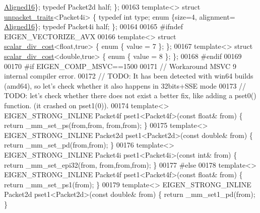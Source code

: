 \begin{DoxyCode}
      \hyperlink{group__enums_gga45fe06e29902b7a2773de05ba27b47a1af8e2bf74b04c02199f62c5e3c06dbfcc}{Aligned16}\}; \textcolor{keyword}{typedef} Packet2d half; \};
00163 \textcolor{keyword}{template}<> \textcolor{keyword}{struct }\hyperlink{struct_eigen_1_1internal_1_1unpacket__traits}{unpacket\_traits}<Packet4i> \{ \textcolor{keyword}{typedef} \textcolor{keywordtype}{int}    type; \textcolor{keyword}{enum} \{size=4, alignment=
      \hyperlink{group__enums_gga45fe06e29902b7a2773de05ba27b47a1af8e2bf74b04c02199f62c5e3c06dbfcc}{Aligned16}\}; \textcolor{keyword}{typedef} Packet4i half; \};
00164 
00165 \textcolor{preprocessor}{#ifndef EIGEN\_VECTORIZE\_AVX}
00166 \textcolor{keyword}{template}<> \textcolor{keyword}{struct }\hyperlink{struct_eigen_1_1internal_1_1scalar__div__cost}{scalar\_div\_cost}<float,true> \{ \textcolor{keyword}{enum} \{ value = 7 \}; \};
00167 \textcolor{keyword}{template}<> \textcolor{keyword}{struct }\hyperlink{struct_eigen_1_1internal_1_1scalar__div__cost}{scalar\_div\_cost}<double,true> \{ \textcolor{keyword}{enum} \{ value = 8 \}; \};
00168 \textcolor{preprocessor}{#endif}
00169 
00170 \textcolor{preprocessor}{#if EIGEN\_COMP\_MSVC==1500}
00171 \textcolor{comment}{// Workaround MSVC 9 internal compiler error.}
00172 \textcolor{comment}{// TODO: It has been detected with win64 builds (amd64), so let's check whether it also happens in
       32bits+SSE mode}
00173 \textcolor{comment}{// TODO: let's check whether there does not exist a better fix, like adding a pset0() function. (it crashed
       on pset1(0)).}
00174 \textcolor{keyword}{template}<> EIGEN\_STRONG\_INLINE Packet4f pset1<Packet4f>(\textcolor{keyword}{const} \textcolor{keywordtype}{float}&  from) \{ \textcolor{keywordflow}{return} \_mm\_set\_ps(from,from,
      from,from); \}
00175 \textcolor{keyword}{template}<> EIGEN\_STRONG\_INLINE Packet2d pset1<Packet2d>(\textcolor{keyword}{const} \textcolor{keywordtype}{double}& from) \{ \textcolor{keywordflow}{return} \_mm\_set\_pd(from,from);
       \}
00176 \textcolor{keyword}{template}<> EIGEN\_STRONG\_INLINE Packet4i pset1<Packet4i>(\textcolor{keyword}{const} \textcolor{keywordtype}{int}&    from) \{ \textcolor{keywordflow}{return} \_mm\_set\_epi32(from,
      from,from,from); \}
00177 \textcolor{preprocessor}{#else}
00178 \textcolor{keyword}{template}<> EIGEN\_STRONG\_INLINE Packet4f pset1<Packet4f>(\textcolor{keyword}{const} \textcolor{keywordtype}{float}&  from) \{ \textcolor{keywordflow}{return} \_mm\_set\_ps1(from); \}
00179 \textcolor{keyword}{template}<> EIGEN\_STRONG\_INLINE Packet2d pset1<Packet2d>(\textcolor{keyword}{const} \textcolor{keywordtype}{double}& from) \{ \textcolor{keywordflow}{return} \_mm\_set1\_pd(from); \}

\end{DoxyCode}
